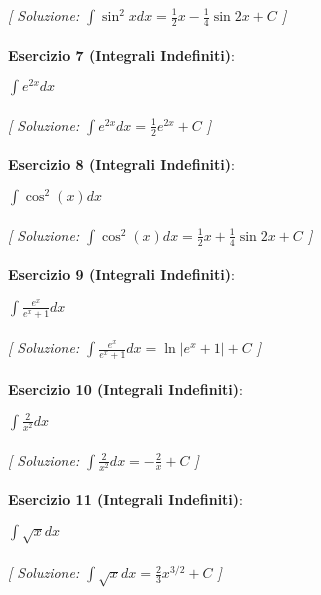 \documentclass{article}
\begin{document}
\textit{[ Soluzione: $\int \sin^2 x  dx = \frac{1}{2}x - \frac{1}{4}\sin 2x + C$ ]}\\\\

\textbf{Esercizio 7 (Integrali Indefiniti)}:\\
\par $\int e^{2x}  dx$ \\\\

\textit{[ Soluzione: $\int e^{2x}  dx = \frac{1}{2}e^{2x} + C$ ]}\\\\

\textbf{Esercizio 8 (Integrali Indefiniti)}:\\
\par $\int \cos^2 (x)  dx$ \\\\

\textit{[ Soluzione: $\int \cos^2 (x)  dx = \frac{1}{2}x + \frac{1}{4}\sin 2x + C$ ]}\\\\

\textbf{Esercizio 9 (Integrali Indefiniti)}:\\
\par $\int \frac{e^x}{e^x + 1}  dx$ \\\\

\textit{[ Soluzione: $\int \frac{e^x}{e^x + 1}  dx = \ln |e^x + 1| + C$ ]}\\\\

\textbf{Esercizio 10 (Integrali Indefiniti)}:\\
\par $\int \frac{2}{x^2}  dx$ \\\\

\textit{[ Soluzione: $\int \frac{2}{x^2}  dx = -\frac{2}{x} + C$ ]}\\\\

\textbf{Esercizio 11 (Integrali Indefiniti)}:\\
\par $\int \sqrt{x}  dx$ \\\\

\textit{[ Soluzione: $\int \sqrt{x}  dx = \frac{2}{3}x^{3/2} + C$ ]}\\\\
\end{document}
